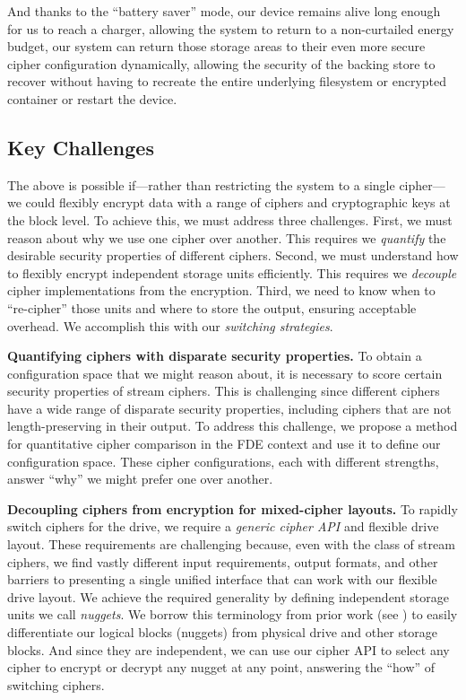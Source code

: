 And thanks to the ``battery saver'' mode, our device remains alive long enough
for us to reach a charger, allowing the system to return to a non-curtailed
energy budget, our system can return those storage areas to their even more
secure cipher configuration dynamically, allowing the security of the backing
store to recover without having to recreate the entire underlying filesystem or
encrypted container or restart the device.

\subsection{Key Challenges}

The above is possible if---rather than restricting the system to a single
cipher---we could flexibly encrypt data with a range of ciphers and
cryptographic keys at the block level. To achieve this, we must address three
challenges. First, we must reason about why we use one cipher over another. This
requires we \emph{quantify} the desirable security properties of different
ciphers. Second, we must understand how to flexibly encrypt independent storage
units efficiently. This requires we \emph{decouple} cipher implementations from
the encryption. Third, we need to know when to ``re-cipher'' those units and
where to store the output, ensuring acceptable overhead. We accomplish this with
our \emph{switching strategies}.

\textbf{Quantifying ciphers with disparate security properties.} To obtain a
configuration space that we might reason about, it is necessary to score certain
security properties of stream ciphers. This is challenging since different
ciphers have a wide range of disparate security properties, including ciphers
that are not length-preserving in their output. To address this challenge, we
propose a method for quantitative cipher comparison in the FDE context and use
it to define our configuration space. These cipher configurations, each with
different strengths, answer ``why'' we might prefer one over another.

\textbf{Decoupling ciphers from encryption for mixed-cipher layouts.} To rapidly
switch ciphers for the drive, we require a \emph{generic cipher API} and
flexible drive layout. These requirements are challenging because, even with the
class of stream ciphers, we find vastly different input requirements, output
formats, and other barriers to presenting a single unified interface that can
work with our flexible drive layout. We achieve the required generality by
defining independent storage units we call \emph{nuggets}. We borrow this
terminology from prior work (see \cite{StrongBox}) to easily differentiate our
logical blocks (nuggets) from physical drive and other storage blocks. And since
they are independent, we can use our cipher API to select any cipher to encrypt
or decrypt any nugget at any point, answering the ``how'' of switching ciphers.


